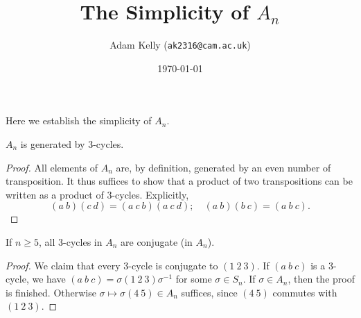 \documentclass[a4paper]{amsart}
\title{The Simplicity of $A_n$}
\author{Adam Kelly (\texttt{ak2316@cam.ac.uk})}
\date{\today}
\begin{document}
\maketitle

Here we establish the simplicity of $A_n$.

\begin{lemma*}
    $A_n$ is generated by 3-cycles.
\end{lemma*}

\begin{proof}
    All elements of $A_n$ are, by definition, generated by an even number of transposition. It thus suffices to show that a product of two transpositions can be written as a product of 3-cycles. Explicitly,
$$
(a\ b)(c\ d) = (a\ c\ b)(a\ c\ d); \quad (a\ b)(b\ c) = (a\ b\ c).
$$
\end{proof}



\begin{lemma*}
    If $n \geq 5$, all 3-cycles in $A_n$ are conjugate (in $A_n$).
\end{lemma*}
\begin{proof}
    We claim that every 3-cycle is conjugate to $(1\ 2\ 3)$. If $(a\ b\ c)$ is a 3-cycle, we have $(a\ b\ c) = \sigma (1\ 2\ 3)\sigma^{-1}$ for some $\sigma \in S_n$. If $\sigma \in A_n$, then the proof is finished. Otherwise $\sigma \mapsto \sigma(4\ 5) \in A_n$ suffices, since $(4\ 5)$ commutes with $(1\ 2\ 3)$.
\end{proof}
\end{document}
